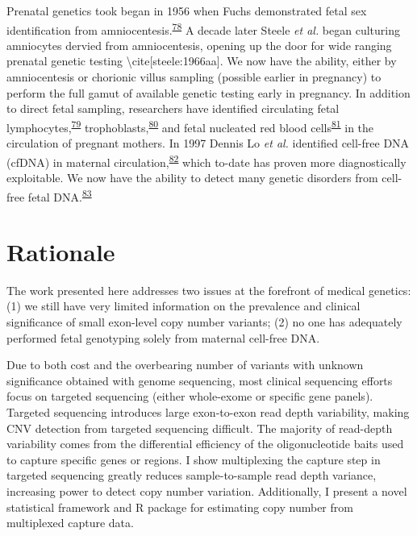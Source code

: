 \documentclass[11pt,letterpaper]{book}
\begin{document}
Prenatal genetics took began in 1956 when Fuchs demonstrated fetal sex identification from amniocentesis.\textsuperscript{\protect\hyperlink{ref-fuchs:1956aa}{78}}
A decade later Steele \emph{et al.} began culturing amniocytes dervied from amniocentesis, opening up the door for wide ranging prenatal genetic testing \textbackslash cite{[}steele:1966aa{]}.
We now have the ability, either by amniocentesis or chorionic villus sampling (possible earlier in pregnancy) to perform the full gamut of available genetic testing early in pregnancy.
In addition to direct fetal sampling, researchers have identified circulating fetal lymphocytes,\textsuperscript{\protect\hyperlink{ref-walknowska:1969aa}{79}} trophoblasts,\textsuperscript{\protect\hyperlink{ref-mueller:1990aa}{80}} and fetal nucleated red blood cells\textsuperscript{\protect\hyperlink{ref-bianchi:1990aa}{81}} in the circulation of pregnant mothers.
In 1997 Dennis Lo \emph{et al.} identified cell-free DNA (cfDNA) in maternal circulation,\textsuperscript{\protect\hyperlink{ref-lo:1997aa}{82}} which to-date has proven more diagnostically exploitable.
We now have the ability to detect many genetic disorders from cell-free fetal DNA.\textsuperscript{\protect\hyperlink{ref-scotchman:2020aa}{83}}

\hypertarget{prob}{%
\section{Rationale}\label{prob}}

The work presented here addresses two issues at the forefront of medical genetics: (1) we still have very limited information on the prevalence and clinical significance of small exon-level copy number variants; (2) no one has adequately performed fetal genotyping solely from maternal cell-free DNA.

Due to both cost and the overbearing number of variants with unknown significance obtained with genome sequencing, most clinical sequencing efforts focus on targeted sequencing (either whole-exome or specific gene panels).
Targeted sequencing introduces large exon-to-exon read depth variability, making CNV detection from targeted sequencing difficult.
The majority of read-depth variability comes from the differential efficiency of the oligonucleotide baits used to capture specific genes or regions.
I show multiplexing the capture step in targeted sequencing greatly reduces sample-to-sample read depth variance, increasing power to detect copy number variation.
Additionally, I present a novel statistical framework and R package for estimating copy number from multiplexed capture data.
\end{document}
